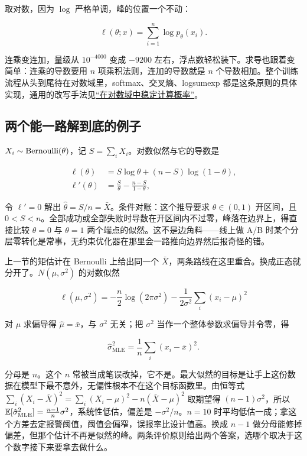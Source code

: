 取对数，因为 \(\log\) 严格单调，峰的位置一个不动：

\[
\ell(\theta;x)=\sum_{i=1}^n\log p_\theta(x_i).
\]

连乘变连加，量级从 \(10^{-4000}\) 变成 \(-9200\) 左右，浮点数轻松装下。求导也跟着变简单：连乘的导数要用 \(n\) 项乘积法则，连加的导数就是 \(n\) 个导数相加。整个训练流程从头到尾待在对数域里，softmax、交叉熵、logsumexp 都是这条原则的具体实现，通用的改写手法见\hyperref[sec:08-Numerical-Analysis/07-Numerical-Methods-for-ML/01]{``在对数域中稳定计算概率''}。

\subsection{两个能一路解到底的例子}

\(X_i\sim\operatorname{Bernoulli}(\theta)\)，记 \(S=\sum_i X_i\)。对数似然与它的导数是

\[
\begin{aligned}
\ell(\theta)&=S\log\theta+(n-S)\log(1-\theta),\\
\ell'(\theta)&=\frac{S}{\theta}-\frac{n-S}{1-\theta},
\end{aligned}
\]

令 \(\ell'=0\) 解出 \(\hat\theta=S/n=\bar X\)。条件对账：这个推导要求 \(\theta\in(0,1)\) 开区间，且 \(0<S<n\)。全部成功或全部失败时导数在开区间内不过零，峰落在边界上，得直接比较 \(\theta=0\) 与 \(\theta=1\) 两个端点的似然。这不是边角料——线上做 A/B 时某个分层零转化是常事，无约束优化器在那里会一路推向边界然后报奇怪的错。

上一节的矩估计在 Bernoulli 上给出同一个 \(\bar X\)，两条路线在这里重合。换成正态就分开了。\(N(\mu,\sigma^2)\) 的对数似然

\[
\ell(\mu,\sigma^2)=-\frac{n}{2}\log(2\pi\sigma^2)-\frac{1}{2\sigma^2}\sum_i(x_i-\mu)^2
\]

对 \(\mu\) 求偏导得 \(\hat\mu=\bar x\)，与 \(\sigma^2\) 无关；把 \(\sigma^2\) 当作一个整体参数求偏导并令零，得

\[
\hat\sigma^2_{\mathrm{MLE}}=\frac1n\sum_i(x_i-\bar x)^2 .
\]

分母是 \(n\)。这个 \(n\) 常被当成笔误改掉，它不是。最大似然的目标是让手上这份数据在模型下最不意外，无偏性根本不在这个目标函数里。由恒等式 \(\sum_i(X_i-\bar X)^2=\sum_i(X_i-\mu)^2-n(\bar X-\mu)^2\) 取期望得 \((n-1)\sigma^2\)，所以 \(\mathbb{E}[\hat\sigma^2_{\mathrm{MLE}}]=\frac{n-1}{n}\sigma^2\)，系统性低估，偏差是 \(-\sigma^2/n\)。\(n=10\) 时平均低估一成；拿这个方差去定报警阈值，阈值会偏窄，误报率比设计值高。换成 \(n-1\) 做分母能修掉偏差，但那个估计不再是似然的峰。两条评价原则给出两个答案，选哪个取决于这个数字接下来要拿去做什么。

